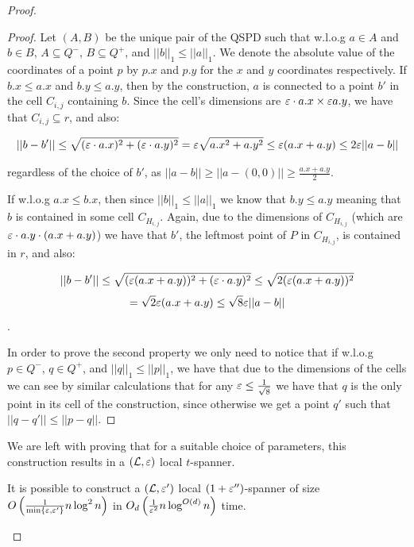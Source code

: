 \documentclass[12pt]{article}%
\begin{document}
\begin{proof}
\begin{claim}
\end{claim}

\begin{proof}
	Let $(A,B)$ be the unique pair of the QSPD such that w.l.o.g $a\in A$ and $b\in B$, $A\subseteq Q^-$, $B\subseteq Q^+$, and $||b||_{1} \leq ||a||_{1}$. We denote the absolute value of the coordinates of a point $p$ by $p.x$ and $p.y$ for the $x$ and $y$ coordinates respectively. If $b.x \leq a.x$ and $b.y \leq a.y$, then by the construction, $a$ is connected to a point $b'$ in the cell $C_{i,j}$ containing $b$. Since the cell's dimensions are $\varepsilon\cdot a.x \times \varepsilon a.y$, we have that $C_{i,j}\subseteq r$, and also:
	
	$$||b-b'||\leq \sqrt{(\varepsilon\cdot a.x)^2+(\varepsilon\cdot a.y)^2}=\varepsilon\sqrt{a.x^2+a.y^2}\leq \varepsilon(a.x+a.y) \leq 2\varepsilon||a-b||$$
	
	regardless of the choice of $b'$, as $||a-b||\geq||a-(0,0)||\geq \frac{a.x+a.y}{2}$. 
	
	If w.l.o.g $a.x\leq b.x$, then since $||b||_{1} \leq ||a||_{1}$ we know that $b.y \leq a.y$ meaning that $b$ is contained in some cell $C_{H_{i,j}}$. Again, due to the dimensions of $C_{H_{i,j}}$ (which are $\eps\cdot a.y \time \eps\cdot(a.x+a.y)$) we have that $b'$, the leftmost point of $P$ in $C_{H_{i,j}}$, is contained in $r$, and also:
	
	$$||b-b'||\leq \sqrt{(\varepsilon (a.x+a.y))^2+(\varepsilon\cdot a.y)^2}\leq \sqrt{2(\varepsilon (a.x+a.y))^2} $$
	$$=\sqrt{2}\varepsilon(a.x+a.y) \leq \sqrt{8}\varepsilon||a-b||$$.
	
	In order to prove the second property we only need to notice that if w.l.o.g $p\in Q^-$, $q\in Q^+$, and $||q||_1\leq ||p||_1$, we have that due to the dimensions of the cells we can see by similar calculations that for any $\varepsilon\leq \frac{1}{\sqrt{8}}$ we have that $q$ is the only point in its cell of the construction, since otherwise we get a point $q'$ such that $||q-q'||\leq ||p-q||$.
	
\end{proof}

We are left with proving that for a suitable choice of parameters, this construction results in a $(\mathcal{L},\varepsilon)$ local $t$-spanner.


\begin{claim}
	It is possible to construct a $(\mathcal{L}, \varepsilon')$ local $(1+\varepsilon'')$-spanner of size $O\left(\frac{1}{\min\{\varepsilon, \varepsilon'\}}n\log^2n\right)$ in $O_d\left(\frac{1}{\varepsilon^2}n\log^{O(d)}n\right)$ time.
\end{claim} 


\end{proof}
\end{document}
